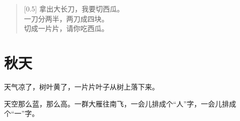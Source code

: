 \documentclass[12pt,UTF-8,openany]{ctexbook}
\begin{document}
\begin{large}
    
    \begin{verse}[0.5\linewidth]
        拿出大长刀，我要切西瓜。 \\
        一刀分两半，两刀成四块。 \\
        切成一片片，请你吃西瓜。
    \end{verse}
    
\end{large}


\clearpage

\begin{center}
    
\end{center}


\hanzibox{}\hanzibox{}\hanzibox{}\hanzibox{}\hspace{1em}\hanzibox{}\hanzibox{}\hanzibox{}\hanzibox{}

\hanzibox{}\hanzibox{}\hanzibox{}\hanzibox{}\hspace{1em}\hanzibox{}\hanzibox{}\hanzibox{}\hanzibox{}

\hanzibox{}\hanzibox{}\hanzibox{}\hanzibox{}\hspace{1em}\hanzibox{}\hanzibox{}\hanzibox{}\hanzibox{}

\hanzibox{}\hanzibox{}\hanzibox{}\hanzibox{}\hspace{1em}




\chapter{秋天}

\begin{large}
    
    天气凉了，树叶黄了，一片片叶子从树上落下来。
    
    天空那么蓝，那么高。一群大雁往南飞，一会儿排成个“人”字，一会儿排成个“一”字。
    
\end{large}


\clearpage

\begin{center}
    
\end{center}
\end{document}
